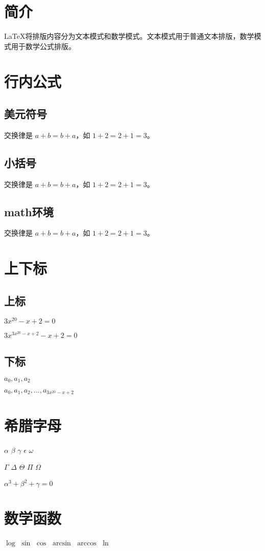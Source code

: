 \documentclass{ctexart}%
\begin{document}
	\section{简介}
	\LaTeX{}将排版内容分为文本模式和数学模式。文本模式用于普通文本排版，数学模式用于数学公式排版。
	\section{行内公式}
	\subsection{美元符号}
	交换律是 $a+b=b+a$，如 $1+2=2+1=3$。
	\subsection{小括号}
	交换律是 \(a+b=b+a\)，如 \(1+2=2+1=3\)。
	\subsection{math环境}
	交换律是 \begin{math}a+b=b+a\end{math}，如 \begin{math}1+2=2+1=3\end{math}。
	
	\section{上下标}
	\subsection{上标}
	$3x^{20}-x+2 = 0$
	
	$3x^{3x^{20}-x+2}-x+2 = 0$
	\subsection{下标}
	$a_0, a_1, a_2$
	
	$a_0, a_1, a_2, ..., a_{3x^{20}-x+2}$
	\section{希腊字母}
	$\alpha$
	$\beta$
	$\gamma$
	$\epsilon$
	$\omega$
	
	$\Gamma$
	$\Delta$
	$\Theta$
	$\Pi$
	$\Omega$
	
	$\alpha^3 + \beta^2 + \gamma = 0$
	\section{数学函数}
	$\log$
	$\sin$
	$\cos$
	$\arcsin$
	$\arccos$
	$\ln$
	
\end{document}

